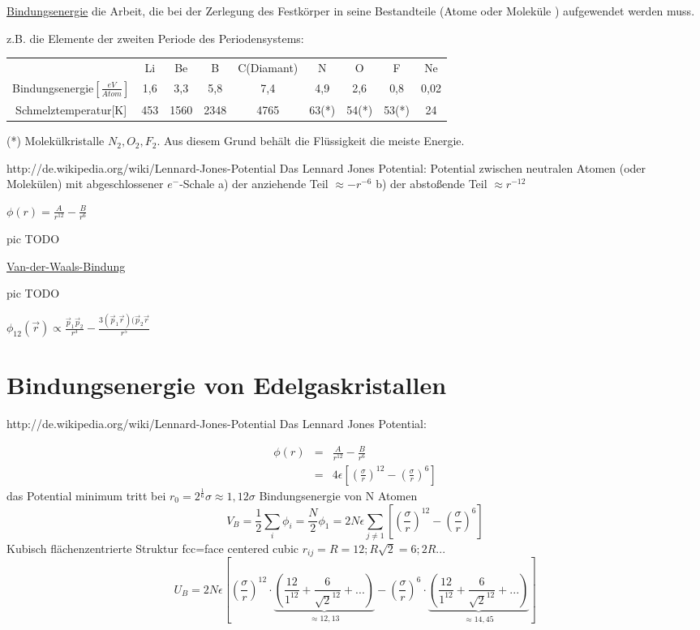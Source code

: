 \underline{Bindungsenergie} 
die Arbeit, die bei der Zerlegung des Festkörper in seine Bestandteile (Atome
oder Moleküle ) aufgewendet werden muss.

z.B. die Elemente der zweiten Periode des Periodensystems:
\begin{tabular}{ccccccccc}
&Li&Be&B&C(Diamant)&N&O&F&Ne\\
Bindungsenergie\(\left[\frac{eV}{Atom}\right]\)&1,6&3,3&5,8&7,4&4,9&2,6&0,8&0,02\\
Schmelztemperatur[K]&453&1560&2348&4765&63(*)&54(*)&53(*)&24
\end{tabular}

(*) Molekülkristalle \(N_2,O_2,F_2\). Aus diesem Grund behält die Flüssigkeit die
meiste Energie.


http://de.wikipedia.org/wiki/Lennard-Jones-Potential
Das Lennard Jones Potential:
Potential zwischen neutralen Atomen (oder Molekülen) mit abgeschlossener
\(e^-\)-Schale
a) der anziehende Teil \(\approx -r^{-6}\)
b) der abstoßende Teil \(\approx r^{-12}\)

\(\boxed{\phi(r)=\frac A {r^{12}}-\frac B {r^{6}}}\)

pic TODO

\underline{Van-der-Waals-Bindung}

pic TODO

\(\phi_{12}(\vec r) \propto \frac {\vec p_1\vec p_2}{r^3}-\frac{3(\vec p_1 \vec
  r)(\vec p_2 \vec r}{r^5}\)

\section{Bindungsenergie von Edelgaskristallen}

http://de.wikipedia.org/wiki/Lennard-Jones-Potential
Das Lennard Jones Potential:

 
\begin{eqnarray}
\phi(r) &=& \frac A {r^{12}}-\frac B {r^6} \\
&=&4\epsilon \left[ \left(\frac\sigma r\right)^{12}-\left(\frac\sigma r\right)^6\right]
\end{eqnarray}
das Potential minimum tritt bei \(r_0=2^{\frac 1 6}\sigma\approx 1,12\sigma\)
Bindungsenergie von N Atomen
\[ V_B=\frac 1 2 \sum_i\phi_i=\frac N 2 \phi_1=2N\epsilon\sum_{j\neq1}\left[
  \left(\frac\sigma r\right)^{12}-\left(\frac\sigma r\right)^6\right] \]
Kubisch flächenzentrierte Struktur fcc=face centered cubic \(r_{ij}=R=12;R\sqrt
2=6;2R...\)
\[ U_B=2N\epsilon\left[
  \left(\frac\sigma r\right)^{12}\cdot\underbrace{
    \left(\frac{12}{1^12}+\frac{6}{\sqrt 2^{12}}+...\right)}_{\approx 12,13}
-\left(\frac\sigma r\right)^6 \cdot\underbrace{
  \left(\frac{12}{1^12}+\frac{6}{\sqrt 2^{12}}+...\right)}_{\approx 14,45}
\right]
\]

